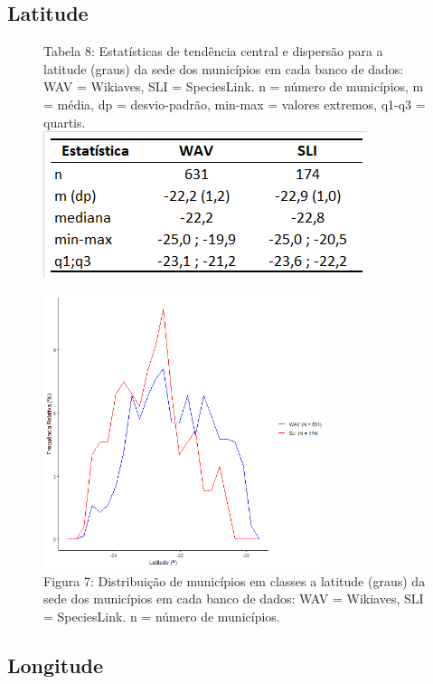 \newpage

\subsection{Latitude}

\begin{figure}[h!]
\centering
{\scriptsize Tabela 8: Estatísticas de tendência central e dispersão para a latitude (graus) da sede dos municípios em cada banco de dados: WAV = Wikiaves, SLI = SpeciesLink. n = número de municípios, m = média, dp = desvio-padrão, min-max = valores extremos, q1-q3 = quartis.}
\\
\includegraphics{Tabelas/8.png}
\end{figure}

\texto

\begin{figure}[h!]
\centering
\includegraphics[height = 8cm]{Imagens/243.png}
\\{\scriptsize Figura 7: Distribuição de municípios em classes a latitude (graus) da sede dos municípios em cada banco de dados: WAV = Wikiaves, SLI = SpeciesLink. n = número de municípios.}
\end{figure}

\newpage

\subsection{Longitude}


